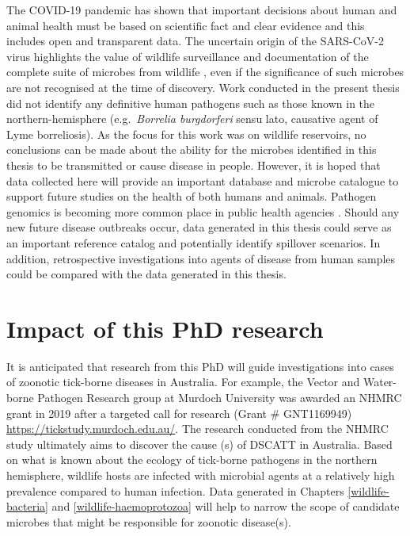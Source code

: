 \documentclass[a4paper, nobind]{templates/ociamthesis}
\begin{document}
The COVID-19 pandemic has shown that important decisions about human and animal health must be based on scientific fact and clear evidence and this includes open and transparent data.
The uncertain origin of the SARS-CoV-2 virus highlights the value of wildlife surveillance and documentation of the complete suite of microbes from wildlife \autocite{burkiOriginSARSCoV22020}, even if the significance of such microbes are not recognised at the time of discovery.
Work conducted in the present thesis did not identify any definitive human pathogens such as those known in the northern-hemisphere (e.g.~\emph{Borrelia burgdorferi} sensu lato, causative agent of Lyme borreliosis).
As the focus for this work was on wildlife reservoirs, no conclusions can be made about the ability for the microbes identified in this thesis to be transmitted or cause disease in people.
However, it is hoped that data collected here will provide an important database and microbe catalogue to support future studies on the health of both humans and animals.
Pathogen genomics is becoming more common place in public health agencies \autocite{armstrongPathogenGenomicsPublic2019}.
Should any new future disease outbreaks occur, data generated in this thesis could serve as an important reference catalog and potentially identify spillover scenarios.
In addition, retrospective investigations into agents of disease from human samples could be compared with the data generated in this thesis.

\hypertarget{impact-of-this-phd-research}{%
\section{Impact of this PhD research}\label{impact-of-this-phd-research}}

It is anticipated that research from this PhD will guide investigations into cases of zoonotic tick-borne diseases in Australia.
For example, the Vector and Water-borne Pathogen Research group at Murdoch University was awarded an NHMRC grant in 2019 after a targeted call for research (Grant \# GNT1169949) \url{https://tickstudy.murdoch.edu.au/}.
The research conducted from the NHMRC study ultimately aims to discover the cause (s) of DSCATT in Australia.
Based on what is known about the ecology of tick-borne pathogens in the northern hemisphere, wildlife hosts are infected with microbial agents at a relatively high prevalence compared to human infection.
Data generated in Chapters \ref{wildlife-bacteria} and \ref{wildlife-haemoprotozoa} will help to narrow the scope of candidate microbes that might be responsible for zoonotic disease(s).
\end{document}
